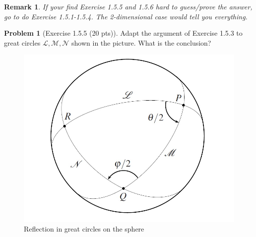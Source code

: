 \documentclass{article}
\theoremstyle{definition}
\newtheorem{problem}{Problem}
\theoremstyle{plain}
\newtheorem*{remark}{Remark}
\begin{document}
\begin{remark}If your find Exercise 1.5.5 and 1.5.6 hard to guess/prove the answer, go to do Exercise 1.5.1-1.5.4. The 2-dimensional case would tell you everything.
\end{remark}

\begin{problem}[Exercise 1.5.5 (20 pts)]Adapt the argument of Exercise 1.5.3 to great circles $\mathscr{L},\mathscr{M},\mathscr{N}$ shown in the picture. What is the conclusion?
\begin{figure}[h]
\centering
\includegraphics[scale=0.7]{hw1p.jpg}
\caption{Reflection in great circles on the sphere}
\end{figure}
\end{problem}
\end{document}
